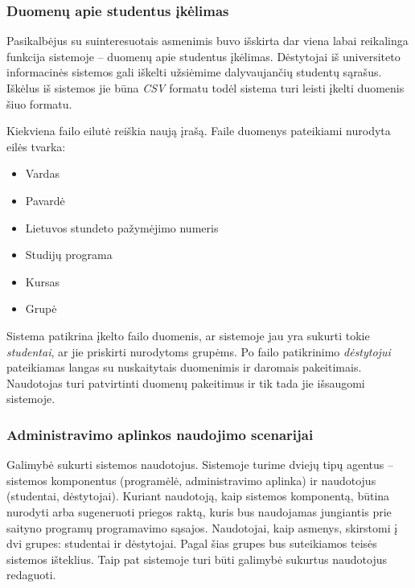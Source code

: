 \documentclass{VUMIFPSbakalaurinis}
\begin{document}
\subsubsection{Duomenų apie studentus įkėlimas} \label{data-import}

Pasikalbėjus su suinteresuotais asmenimis buvo išskirta dar viena labai reikalinga funkcija sistemoje – duomenų apie studentus įkėlimas. Dėstytojai iš universiteto informacinės sistemos gali iškelti užsiėmime dalyvaujančių studentų sąrašus. Iškėlus iš sistemos jie būna \textit{CSV} formatu todėl sistema turi leisti įkelti duomenis šiuo formatu.

Kiekviena failo eilutė reiškia naują įrašą. Faile duomenys pateikiami nurodyta eilės tvarka:

\begin{itemize}
    \item Vardas
    \item Pavardė
    \item Lietuvos stundeto pažymėjimo numeris
    \item Studijų programa
    \item Kursas
    \item Grupė
\end{itemize}

Sistema patikrina įkelto failo duomenis, ar sistemoje jau yra sukurti tokie \textit{studentai}, ar jie priskirti nurodytoms grupėms. Po failo patikrinimo \textit{dėstytojui} pateikiamas langas su nuskaitytais duomenimis ir daromais pakeitimais. Naudotojas turi patvirtinti duomenų pakeitimus ir tik tada jie išsaugomi sistemoje.

\subsubsection{Administravimo aplinkos naudojimo scenarijai}


Galimybė sukurti sistemos naudotojus. Sistemoje turime dviejų tipų agentus – sistemos komponentus (programėlė, administravimo aplinka) ir naudotojus (studentai, dėstytojai). Kuriant naudotoją, kaip sistemos komponentą, būtina nurodyti arba sugeneruoti priegos raktą, kuris bus naudojamas jungiantis prie saityno programų programavimo sąsajos. Naudotojai, kaip asmenys, skirstomi į dvi grupes: studentai ir dėstytojai. Pagal šias grupes bus suteikiamos teisės sistemos išteklius. Taip pat sistemoje turi būti galimybė sukurtus naudotojus redaguoti.
\end{document}
